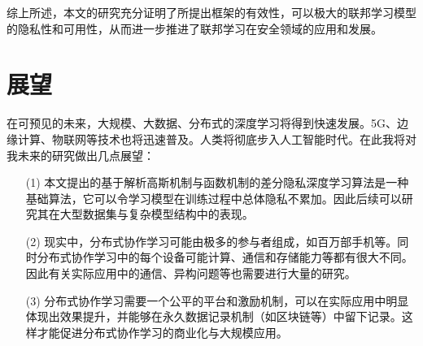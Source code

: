 综上所述，本文的研究充分证明了所提出框架的有效性，可以极大的联邦学习模型的隐私性和可用性，从而进一步推进了联邦学习在安全领域的应用和发展。

\section{展望}
在可预见的未来，大规模、大数据、分布式的深度学习将得到快速发展。5G、边缘计算、物联网等技术也将迅速普及。人类将彻底步入人工智能时代。在此我将对我未来的研究做出几点展望：
\begin{enumerate}
\item [(1)] 本文提出的基于解析高斯机制与函数机制的差分隐私深度学习算法是一种基础算法，它可以令学习模型在训练过程中总体隐私不累加。因此后续可以研究其在大型数据集与复杂模型结构中的表现。 
\item [(2)] 现实中，分布式协作学习可能由极多的参与者组成，如百万部手机等。同时分布式协作学习中的每个设备可能计算、通信和存储能力等都有很大不同。因此有关实际应用中的通信、异构问题等也需要进行大量的研究。 
\item[(3)] 分布式协作学习需要一个公平的平台和激励机制，可以在实际应用中明显体现出效果提升，并能够在永久数据记录机制（如区块链等）中留下记录。这样才能促进分布式协作学习的商业化与大规模应用。
\end{enumerate}

